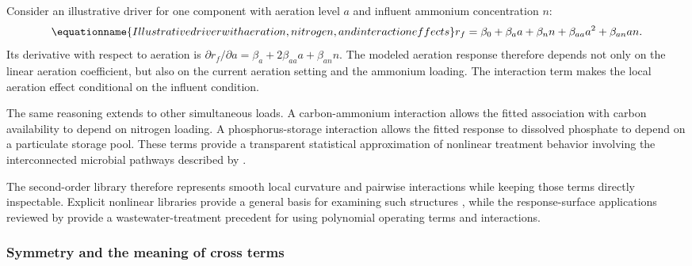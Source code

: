 Consider an illustrative driver for one component with aeration level \(a\) and influent ammonium concentration \(n\):
\begin{equation}
\equationname{Illustrative driver with aeration, nitrogen, and interaction effects}
\label{eq:icsor_example_driver}
r_f=\beta_0+\beta_a a+\beta_n n+\beta_{aa}a^2+\beta_{an}an.
\end{equation}
Its derivative with respect to aeration is \(\partial r_f/\partial a=\beta_a+2\beta_{aa}a+\beta_{an}n\). The modeled aeration response therefore depends not only on the linear aeration coefficient, but also on the current aeration setting and the ammonium loading. The interaction term makes the local aeration effect conditional on the influent condition.

The same reasoning extends to other simultaneous loads. A carbon-ammonium interaction allows the fitted association with carbon availability to depend on nitrogen loading. A phosphorus-storage interaction allows the fitted response to dissolved phosphate to depend on a particulate storage pool. These terms provide a transparent statistical approximation of nonlinear treatment behavior involving the interconnected microbial pathways described by \citet{Henze1999}.

The second-order library therefore represents smooth local curvature and pairwise interactions while keeping those terms directly inspectable. Explicit nonlinear libraries provide a general basis for examining such structures \citep{Brunton2016}, while the response-surface applications reviewed by \citet{Nazlabadi2021} provide a wastewater-treatment precedent for using polynomial operating terms and interactions.

\subsubsection{Symmetry and the meaning of cross terms}

